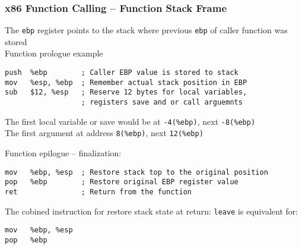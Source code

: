 \documentclass{beamer}
\begin{document}
\begin{frame}[fragile]
\frametitle{x86 Function Calling -- Function Stack Frame}
The \texttt{ebp} register points to the stack where previous \texttt{ebp} of caller function was stored\\
\bigskip
Function prologue example
\begin{verbatim}
push  %ebp        ; Caller EBP value is stored to stack
mov   %esp, %ebp  ; Remember actual stack position in EBP
sub   $12, %esp   ; Reserve 12 bytes for local variables,
                  ; registers save and or call arguemnts
\end{verbatim}

The first local variable or save would be at  \texttt{-4(\%ebp)}, next \texttt{-8(\%ebp)}\\
The first argument at address \texttt{8(\%ebp)}, next \texttt{12(\%ebp)}

Function epilogue -- finalization:
\begin{verbatim}
mov   %ebp, %esp  ; Restore stack top to the original position
pop   %ebp        ; Restore original EBP register value
ret               ; Return from the function
\end{verbatim}

The cobined instruction for restore stack state at return:
\texttt{leave} is equivalent for:
\begin{verbatim}
mov   %ebp, %esp 
pop   %ebp
\end{verbatim}

\end{frame}
\end{document}
